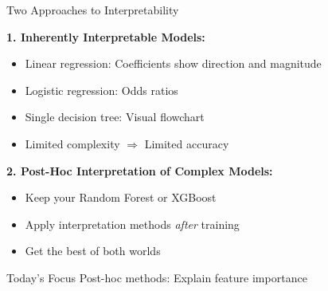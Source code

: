 \documentclass[10pt]{beamer}
\begin{document}
\begin{frame}{Two Approaches to Interpretability}

  \textbf{1. Inherently Interpretable Models:}
  \begin{itemize}
    \item Linear regression: Coefficients show direction and magnitude
    \item Logistic regression: Odds ratios
    \item Single decision tree: Visual flowchart
    \item Limited complexity $\Rightarrow$ Limited accuracy
  \end{itemize}

  \vspace{1em}
  \textbf{2. Post-Hoc Interpretation of Complex Models:}
  \begin{itemize}
    \item Keep your Random Forest or XGBoost
    \item Apply interpretation methods \emph{after} training
    \item Get the best of both worlds
  \end{itemize}

  \vspace{0.5em}
  \begin{block}{Today's Focus}
    Post-hoc methods: Explain feature importance
  \end{block}
\end{frame}

\end{document}
